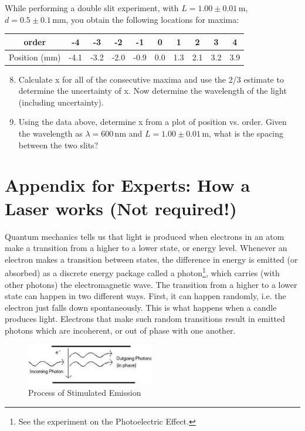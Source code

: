 While performing a double slit experiment, with $L = 1.00\pm 0.01\,\mathrm{m}$, $d = 0.5\pm 0.1\, \mathrm{mm}$, you obtain the following locations for maxima:
\begin{table}[h]
  \centering
  \begin{tabular}{|c|c|c|c|c|c|c|c|c|c|}
    \hline
    order&-4&-3&-2&-1&0&1&2&3&4\\
    \hline
    Position (mm)&-4.1&-3.2&-2.0&-0.9&0.0&1.3&2.1&3.2&3.9\\
    \hline
  \end{tabular}
\end{table}
\begin{enumerate}\setcounter{enumi}{7}
\item Calculate x for all of the consecutive maxima and use the 2/3 estimate to determine the uncertainty of x. Now determine the wavelength of the light (including uncertainty).
\item Using the data above, determine x from a plot of position vs. order. Given the wavelength as $\lambda = 600\,\mathrm{nm}$ and $L = 1.00\pm 0.01\,\mathrm{m}$, what is the spacing between the two slits?
\end{enumerate}

\section{Appendix for Experts: How a Laser works (Not required!)}
Quantum mechanics tells us that light is produced when electrons in an atom make a transition from a higher to a lower state, or energy level. Whenever an electron makes a
transition between states, the difference in energy is emitted (or absorbed) as a discrete energy package called a photon\footnote{See the experiment on the Photoelectric Effect.}, which carries (with other photons) the electromagnetic wave. The transition from a higher to a lower state can happen in two different ways. First, it can happen randomly, i.e. the electron just falls down spontaneously. This is what happens when a candle produces light. Electrons that make such random transitions result in emitted photons which are incoherent, or out of phase with one another. \myskip
\begin{figure}[h]
\centering
\includegraphics[width=0.5\textwidth]{./Exp8/pic/image9.png}
\caption{Process of Stimulated Emission}
\label{fig:stimulatedemission}
\end{figure} 

